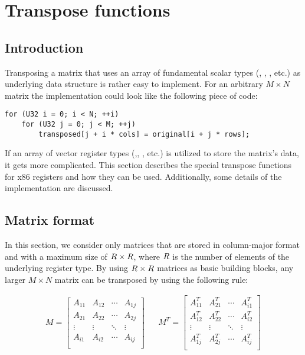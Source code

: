 \section{Transpose functions}

\subsection{Introduction}
Transposing a matrix that uses an array of fundamental scalar types (, , , etc.) as underlying data structure is rather easy to implement.
For an arbitrary $M \times N$ matrix the implementation could look like the following piece of code:

\begin{verbatim}
for (U32 i = 0; i < N; ++i)
    for (U32 j = 0; j < M; ++j)
        transposed[j + i * cols] = original[i + j * rows];
\end{verbatim}

If an array of vector register types (,, , etc.) is utilized to store the matrix's data, it gets more complicated.
This section describes the special transpose functions for x86 registers and how they can be used.
Additionally, some details of the implementation are discussed.

\subsection{Matrix format}
\label{sec:transpose_matrix_format}
In this section, we consider only matrices that are stored in column-major format and with a maximum size of $R \times R$, where $R$ is the number of elements of the underlying register type.
By using $R \times R$ matrices as basic building blocks, any larger $M \times N$ matrix can be transposed by using the following rule:

\begin{align}
M =
\begin{bmatrix}
A_{11} & A_{12} & \cdots & A_{1j}\\
A_{21} & A_{22} & \cdots & A_{2j}\\
\vdots & \vdots & \ddots &\vdots \\
A_{i1} & A_{i2} & \cdots & A_{ij}\\
\end{bmatrix} && 
M^T =
\begin{bmatrix}
A_{11}^T & A_{21}^T & \cdots & A_{i1}^T\\
A_{12}^T & A_{22}^T & \cdots & A_{i2}^T\\
\vdots   & \vdots   & \ddots &\vdots \\
A_{1j}^T & A_{2j}^T & \cdots & A_{ij}^T\\
\end{bmatrix}  
\end{align}

